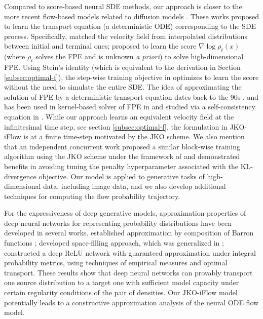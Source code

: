 \documentclass{article}
\theoremstyle{remark}
\theoremstyle{plain}
\newcommand{\JKO}{JKO-iFlow}
\begin{document}
%
%
Compared to score-based neural SDE methods, our approach is closer to the more recent flow-based models related to diffusion models \citep{lipman2023flow,albergo2023building,boffi2023probability}. These works proposed to learn the transport equation (a deterministic ODE) corresponding to the SDE process.
Specifically, \citep{lipman2023flow,albergo2023building} matched the velocity field from interpolated distributions between initial and terminal ones;
\citep{boffi2023probability} proposed to learn the score $\nabla \log \rho_t(x)$ (where $\rho_t$ solves the FPE and is unknown {\it a priori}) to solve high-dimensional FPE.
Using Stein's identity (which is equivalent to the derivation in Section \ref{subsec:optimal-f}), the step-wise training objective in \citep{boffi2023probability} optimizes to learn the score without the need to simulate the entire SDE. 
%
The idea of approximating the solution of FPE by a deterministic transport equation dates back to the 90s \cite{degond1990deterministic,degond1989weighted},
and has been used in kernel-based solver of FPE in \citep{maoutsa2020interacting} and studied via a self-consistency equation in \citep{shen2022self}.
While our approach learns an equivalent velocity field at the infinitesimal time step, see section \ref{subsec:optimal-f}, the formulation in \JKO{} is at a finite time-step motivated by the JKO scheme. 
% 
We also mention that an independent concurrent work \citep{vidal2023taming} proposed a similar block-wise training algorithm using the JKO scheme under the framework of \citep{OT-Flow}
and demonstrated benefits in avoiding tuning the penalty hyperparameter associated with the KL-divergence objective.
%
Our model is applied to generative tasks of high-dimensional data, including image data, and we also develop additional techniques for computing the flow probability trajectory.

% 
For the expressiveness of deep generative models, 
% 
approximation properties of deep neural networks for representing probability distributions have been developed in several works.
\cite{lee2017ability} established approximation by composition of Barron functions \citep{barron1993universal};
\cite{bailey2018size} developed space-filling approach, which was generalized in \cite{perekrestenko2020constructive,perekrestenko2021high}; \cite{lu2020universal} constructed a deep ReLU network with guaranteed approximation under integral probability metrics, using techniques of empirical measures and optimal transport.
These results show that deep neural networks can provably transport one source distribution to a target one with sufficient model capacity under certain regularity conditions of the pair of densities. 
Our \JKO{} model potentially leads to a constructive approximation analysis of the neural ODE flow model.
%
\end{document}
